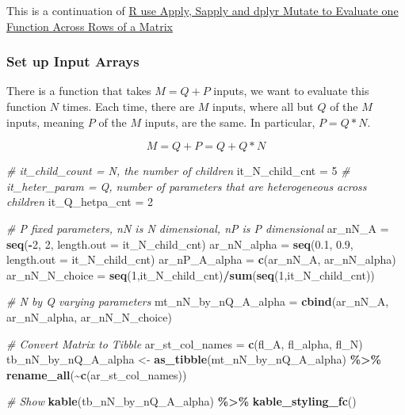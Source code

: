 \documentclass[
]{book}
\newenvironment{Shaded}{\begin{snugshade}}{\end{snugshade}}
\newcommand{\CommentTok}[1]{\textcolor[rgb]{0.56,0.35,0.01}{\textit{#1}}}
\newcommand{\DataTypeTok}[1]{\textcolor[rgb]{0.13,0.29,0.53}{#1}}
\newcommand{\DecValTok}[1]{\textcolor[rgb]{0.00,0.00,0.81}{#1}}
\newcommand{\FloatTok}[1]{\textcolor[rgb]{0.00,0.00,0.81}{#1}}
\newcommand{\KeywordTok}[1]{\textcolor[rgb]{0.13,0.29,0.53}{\textbf{#1}}}
\newcommand{\NormalTok}[1]{#1}
\newcommand{\OperatorTok}[1]{\textcolor[rgb]{0.81,0.36,0.00}{\textbf{#1}}}
\newcommand{\StringTok}[1]{\textcolor[rgb]{0.31,0.60,0.02}{#1}}
\begin{document}
This is a continuation of \href{https://fanwangecon.github.io/R4Econ/function/noloop/fs_applysapplymutate.html}{R use Apply, Sapply and dplyr Mutate to Evaluate one Function Across Rows of a Matrix}

\hypertarget{set-up-input-arrays}{%
\subsubsection{Set up Input Arrays}\label{set-up-input-arrays}}

There is a function that takes \(M=Q+P\) inputs, we want to evaluate this function \(N\) times. Each time, there are \(M\) inputs, where all but \(Q\) of the \(M\) inputs, meaning \(P\) of the \(M\) inputs, are the same. In particular, \(P=Q*N\).

\[M = Q+P = Q + Q*N\]

\begin{Shaded}
\begin{Highlighting}[]
\CommentTok{\# it\_child\_count = N, the number of children}
\NormalTok{it\_N\_child\_cnt =}\StringTok{ }\DecValTok{5}
\CommentTok{\# it\_heter\_param = Q, number of parameters that are heterogeneous across children}
\NormalTok{it\_Q\_hetpa\_cnt =}\StringTok{ }\DecValTok{2}

\CommentTok{\# P fixed parameters, nN is N dimensional, nP is P dimensional}
\NormalTok{ar\_nN\_A =}\StringTok{ }\KeywordTok{seq}\NormalTok{(}\OperatorTok{{-}}\DecValTok{2}\NormalTok{, }\DecValTok{2}\NormalTok{, }\DataTypeTok{length.out =}\NormalTok{ it\_N\_child\_cnt)}
\NormalTok{ar\_nN\_alpha =}\StringTok{ }\KeywordTok{seq}\NormalTok{(}\FloatTok{0.1}\NormalTok{, }\FloatTok{0.9}\NormalTok{, }\DataTypeTok{length.out =}\NormalTok{ it\_N\_child\_cnt)}
\NormalTok{ar\_nP\_A\_alpha =}\StringTok{ }\KeywordTok{c}\NormalTok{(ar\_nN\_A, ar\_nN\_alpha)}
\NormalTok{ar\_nN\_N\_choice =}\StringTok{ }\KeywordTok{seq}\NormalTok{(}\DecValTok{1}\NormalTok{,it\_N\_child\_cnt)}\OperatorTok{/}\KeywordTok{sum}\NormalTok{(}\KeywordTok{seq}\NormalTok{(}\DecValTok{1}\NormalTok{,it\_N\_child\_cnt))}

\CommentTok{\# N by Q varying parameters}
\NormalTok{mt\_nN\_by\_nQ\_A\_alpha =}\StringTok{ }\KeywordTok{cbind}\NormalTok{(ar\_nN\_A, ar\_nN\_alpha, ar\_nN\_N\_choice)}

\CommentTok{\# Convert Matrix to Tibble}
\NormalTok{ar\_st\_col\_names =}\StringTok{ }\KeywordTok{c}\NormalTok{(}\StringTok{\textquotesingle{}fl\_A\textquotesingle{}}\NormalTok{, }\StringTok{\textquotesingle{}fl\_alpha\textquotesingle{}}\NormalTok{, }\StringTok{\textquotesingle{}fl\_N\textquotesingle{}}\NormalTok{)}
\NormalTok{tb\_nN\_by\_nQ\_A\_alpha \textless{}{-}}\StringTok{ }\KeywordTok{as\_tibble}\NormalTok{(mt\_nN\_by\_nQ\_A\_alpha) }\OperatorTok{\%\textgreater{}\%}\StringTok{ }\KeywordTok{rename\_all}\NormalTok{(}\OperatorTok{\textasciitilde{}}\KeywordTok{c}\NormalTok{(ar\_st\_col\_names))}

\CommentTok{\# Show}
\KeywordTok{kable}\NormalTok{(tb\_nN\_by\_nQ\_A\_alpha) }\OperatorTok{\%\textgreater{}\%}
\StringTok{  }\KeywordTok{kable\_styling\_fc}\NormalTok{()}
\end{Highlighting}
\end{Shaded}
\end{document}
